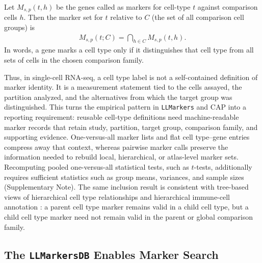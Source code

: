 \documentclass[10pt,twocolumn]{article}
\theoremstyle{plain}
\theoremstyle{definition}
\theoremstyle{remark}
\begin{document}
Let $M_{s,p}(t,h)$ be the genes called as markers for cell-type $t$ against comparison cells $h$. Then the marker set for $t$ relative to $C$ (the set of all comparison cell groups) is
\begin{align}
  M_{s,p}(t;C) = \bigcap_{h\in C} M_{s,p}(t,h).
\end{align}
In words, a gene marks a cell type only if it distinguishes that cell type from all sets of cells in the chosen comparison family.

 Thus, in single-cell RNA-seq, a cell type label is not a self-contained definition of marker identity. It is a measurement statement tied to the cells assayed, the partition analyzed, and the alternatives from which the target group was distinguished. This turns the empirical pattern in \texttt{LLMarkers} and CAP into a reporting requirement: reusable cell-type definitions need machine-readable marker records that retain study, partition, target group, comparison family, and supporting evidence. One-versus-all marker lists and flat cell type--gene entries compress away that context, whereas pairwise marker calls preserve the information needed to rebuild local, hierarchical, or atlas-level marker sets. Recomputing pooled one-versus-all statistical tests, such as $t$-tests, additionally requires sufficient statistics such as group means, variances, and sample sizes (Supplementary Note). The same inclusion result is consistent with tree-based views of hierarchical cell type relationships and hierarchical immune-cell annotation \citep{Domcke2023ReferenceCellTree,Beltz2026ImmuneHierarchy}: a parent cell type marker remains valid in a child cell type, but a child cell type marker need not remain valid in the parent or global comparison family.

\subsection*{The \texttt{LLMarkersDB} Enables Marker Search}
\end{document}
